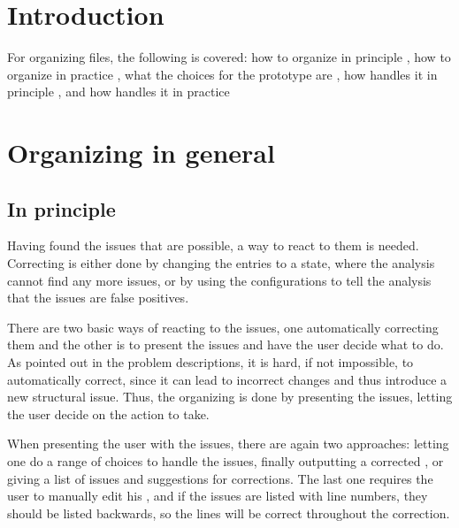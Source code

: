 
\section{Introduction}

For organizing {\bibtex} files, the following is covered: how to
organize in principle , how to
organize in practice , what the
choices for the prototype {\orangutan} are
, how {\orangutan} handles it
in principle , and how
{\orangutan} handles it in practice


\section{Organizing in general}

\subsection{In principle}
\label{sec:organizing_principle}

Having found the issues that are possible, a way to react to them is
needed.  Correcting is either done by changing the entries to a state,
where the analysis cannot find any more issues, or by using the
configurations to tell the analysis that the issues are false
positives.

There are two basic ways of reacting to the issues, one automatically
correcting them and the other is to present the issues and have the
user decide what to do.  As pointed out in the problem descriptions,
it is hard, if not impossible, to automatically correct, since it can
lead to incorrect changes and thus introduce a new structural issue.
Thus, the organizing is done by presenting the issues, letting the user
decide on the action to take.

When presenting the user with the issues, there are again two
approaches: letting one do a range of choices to handle the issues,
finally outputting a corrected , or giving a list of issues
and suggestions for corrections.  The last one requires the user to
manually edit his , and if the issues are listed with line
numbers, they should be listed backwards, so the lines will be correct
throughout the correction.

